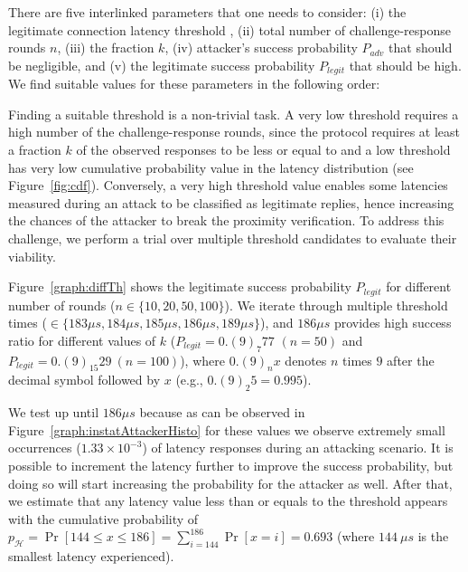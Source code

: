 There are five interlinked parameters that one needs to consider: (i) the legitimate connection latency threshold \connect, (ii) total number of challenge-response rounds $n$, (iii) the fraction $k$, (iv) attacker's success probability $P_{adv}$ that should be negligible, and (v) the legitimate success probability $P_{legit}$ that should be high. We find suitable values for these parameters in the following order:



\newcommand{\mainResultCaption}{\textbf{Distinguishing relay attack.} The attacker's success probability $P_{adv}$ and the legitimate success probability $P_{legit}$ in proximity verification for different number of rounds ($n$) given a fixed $k=0.4$.}


 Finding a suitable threshold \connect is a non-trivial task. A very low threshold requires a high number of the challenge-response rounds, since the protocol requires at least a fraction $k$ of the observed responses to be less or equal to \connect and a low threshold has very low cumulative probability value in the latency distribution (see Figure~\ref{fig:cdf}). Conversely, a very high threshold value enables some latencies measured during an attack to be classified as legitimate replies, hence increasing the chances of the attacker to break the proximity verification. To address this challenge, we perform a trial over multiple threshold candidates to evaluate their viability.


Figure~\ref{graph:diffTh} shows the legitimate success probability $P_{legit}$ for different number of rounds ($n\in\{10,20,50,100\}$). We iterate through multiple threshold times (\connect$\in\{183\mu s,184\mu s,185\mu s, 186\mu s, 189\mu s\}$), and $186\mu s$ provides high success ratio for different values of $k$ ($P_{legit}=0.(9)_7 77$ $(n=50)$ and $P_{legit}=0.(9)_15 29\ (n=100)$), where $0.(9)_n x$ denotes $n$ times $9$ after the decimal symbol followed by $x$ (e.g., $0.(9)_2 5=0.995$).

We test \connect up until $186 \mu s$ because as can be observed in Figure~\ref{graph:instatAttackerHisto} for these values we observe extremely small occurrences ($1.33\times10^{-3}$) of latency responses during an attacking scenario. It is possible to increment the latency further to improve the success probability, but doing so will start increasing the probability for the attacker as well. 
%
After that, we estimate that any latency value less than or equals to the threshold \connect appears with the cumulative probability of $p_{\mathcal{H}} = \Pr[144\leq x \leq 186] = \sum_{i=144}^{186}\Pr[x=i] = 0.693$ (where $144\ \mu s$ is the smallest latency experienced).

